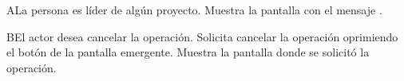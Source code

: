  \begin{UCtrayectoriaA}{A}{La persona es líder de algún proyecto.}
    \UCpaso[\UCsist] Muestra la pantalla  con el mensaje .
 \end{UCtrayectoriaA} 
 \begin{UCtrayectoriaA}{B}{El actor desea cancelar la operación.}
    \UCpaso[\UCactor] Solicita cancelar la operación oprimiendo el botón  de la pantalla emergente.
    \UCpaso[\UCsist] Muestra la pantalla donde se solicitó la operación.
 \end{UCtrayectoriaA} 